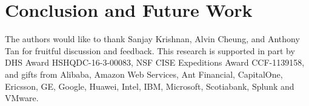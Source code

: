 \section{Conclusion and Future Work}

\begin{acks}
  The authors would like to thank Sanjay Krishnan, Alvin Cheung, and Anthony
  Tan for fruitful discussion and feedback.
  This research is supported in part by DHS Award HSHQDC-16-3-00083, NSF CISE
  Expeditions Award CCF-1139158, and gifts from Alibaba, Amazon Web Services, Ant
  Financial, CapitalOne, Ericsson, GE, Google, Huawei, Intel, IBM, Microsoft,
  Scotiabank, Splunk and VMware.
\end{acks}
